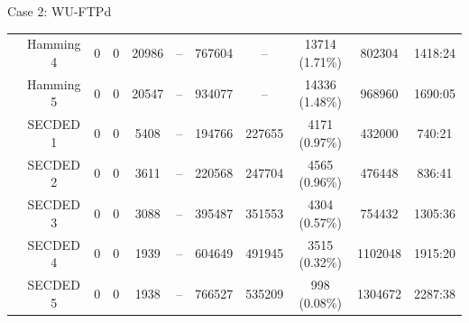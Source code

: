 \begin{frame}[noframenumbering]{Case 2: WU-FTPd}
\begin{table}[H]
\begin{tabular}{@{}ccccccccccc@{}}
                                                             & Hamming 4     & 0     & 0           & \num{20986} & --          & \num{767604}                             & --                                      & \num{13714} {\tiny (1.71\%)} & \num{802304}   & 1418:24                                 \\
                                                             & Hamming 5     & 0     & 0           & \num{20547} & --          & \num{934077}                             & --                                      & \num{14336} {\tiny (1.48\%)} & \num{968960}   & 1690:05                                 \\
                                                             & SECDED 1      & 0     & 0           & 5408        & --          & \num{194766}                             & \num{227655}                            & 4171 {\tiny (0.97\%)}        & \num{432000}   & 740:21                                  \\
                                                             & SECDED 2      & 0     & 0           & 3611        & --          & \num{220568}                             & \num{247704}                            & 4565 {\tiny (0.96\%)}        & \num{476448}   & 836:41                                  \\
                                                             & SECDED 3      & 0     & 0           & 3088        & --          & \num{395487}                             & \num{351553}                            & 4304 {\tiny (0.57\%)}        & \num{754432}   & 1305:36                                 \\
                                                             & SECDED 4      & 0     & 0           & 1939        & --          & \num{604649}                             & \num{491945}                            & 3515 {\tiny (0.32\%)}        & \num{1102048}  & 1915:20                                 \\
                                                             & SECDED 5      & 0     & 0           & 1938        & --          & \num{766527}                             & \num{535209}                            & 998 {\tiny (0.08\%)}         & \num{1304672}  & 2287:38                                 \\
            \bottomrule
        \end{tabular}
    \end{table}
\end{frame}
